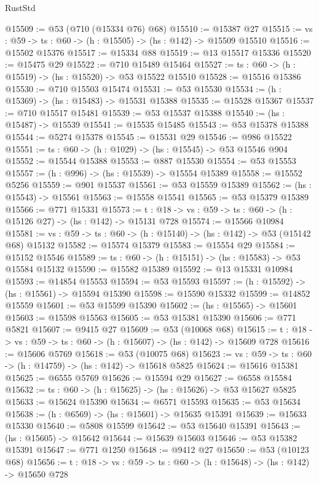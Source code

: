 \begin{lexlean}{RustStd}
\begin{coremodule}
@15509 := @53 (@710 (@15334 @76) @68)
@15510 := @15387 @27
@15515 := {vs : @59} -> {ts : @60} -> (h : @15505) -> (hs : @142) -> @15509 @15510
@15516 := @15502 @15376
@15517 := @15334 @88
@15519 := @13 @15517 @15336
@15520 := @15475 @29
@15522 := @710 @15489 @15464
@15527 := {ts : @60} -> (h : @15519) -> (hs : @15520) -> @53 @15522 @15510
@15528 := @15516 @15386
@15530 := @710 @15503 @15474
@15531 := @53 @15530
@15534 := (h : @15369) -> (hs : @15483) -> @15531 @15388
@15535 := @15528 @15367
@15537 := @710 @15517 @15481
@15539 := @53 @15537 @15388
@15540 := (hs : @15487) -> @15539
@15541 := @15535 @15485
@15543 := @53 @15378 @15388
@15544 := @5274 @15378
@15545 := @15531 @29
@15546 := @986 @15522
@15551 := {ts : @60} -> (h : @1029) -> (hs : @15545) -> @53 @15546 @904
@15552 := @15544 @15388
@15553 := @887 @15530
@15554 := @53 @15553
@15557 := (h : @996) -> (hs : @15539) -> @15554 @15389
@15558 := @15552 @5256
@15559 := @901 @15537
@15561 := @53 @15559 @15389
@15562 := (hs : @15543) -> @15561
@15563 := @15558 @15541
@15565 := @53 @15379 @15389
@15566 := @771 @15331
@15573 := {t : @18} -> {vs : @59} -> {ts : @60} -> (h : @15126 @27) -> (hs : @142) -> @15131 @728
@15574 := @15566 @10984
@15581 := {vs : @59} -> {ts : @60} -> (h : @15140) -> (hs : @142) -> @53 (@15142 @68) @15132
@15582 := @15574 @15379
@15583 := @15554 @29
@15584 := @15152 @15546
@15589 := {ts : @60} -> (h : @15151) -> (hs : @15583) -> @53 @15584 @15132
@15590 := @15582 @15389
@15592 := @13 @15331 @10984
@15593 := @14854 @15553
@15594 := @53 @15593
@15597 := (h : @15592) -> (hs : @15561) -> @15594 @15390
@15598 := @15590 @15332
@15599 := @14852 @15559
@15601 := @53 @15599 @15390
@15602 := (hs : @15565) -> @15601
@15603 := @15598 @15563
@15605 := @53 @15381 @15390
@15606 := @771 @5821
@15607 := @9415 @27
@15609 := @53 (@10068 @68)
@15615 := {t : @18} -> {vs : @59} -> {ts : @60} -> (h : @15607) -> (hs : @142) -> @15609 @728
@15616 := @15606 @5769
@15618 := @53 (@10075 @68)
@15623 := {vs : @59} -> {ts : @60} -> (h : @14759) -> (hs : @142) -> @15618 @5825
@15624 := @15616 @15381
@15625 := @6555 @5769
@15626 := @15594 @29
@15627 := @6558 @15584
@15632 := {ts : @60} -> (h : @15625) -> (hs : @15626) -> @53 @15627 @5825
@15633 := @15624 @15390
@15634 := @6571 @15593
@15635 := @53 @15634
@15638 := (h : @6569) -> (hs : @15601) -> @15635 @15391
@15639 := @15633 @15330
@15640 := @5808 @15599
@15642 := @53 @15640 @15391
@15643 := (hs : @15605) -> @15642
@15644 := @15639 @15603
@15646 := @53 @15382 @15391
@15647 := @771 @1250
@15648 := @9412 @27
@15650 := @53 (@10123 @68)
@15656 := {t : @18} -> {vs : @59} -> {ts : @60} -> (h : @15648) -> (hs : @142) -> @15650 @728

\end{coremodule}
\end{lexlean}
